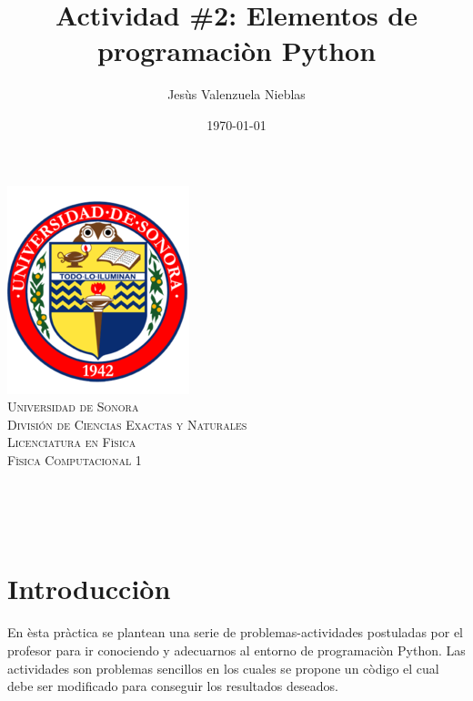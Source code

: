 \documentclass[12pt]{article}
\title{Actividad \#2: Elementos de programaciòn Python }
\author{\Large Jesùs Valenzuela Nieblas\\}
\date{\today}
\makeatletter
\let\thetitle\@title
\let\theauthor\@author
\let\thedate\@date
\makeatother
\begin{document}

\begin{titlepage}
	\centering
    \vspace*{.5cm}
     \includegraphics[scale = 0.7]{logo}\\	%
    \textsc{\Large Universidad de Sonora}\\[1.0 cm]	%
	\textsc{\Large División de Ciencias Exactas y Naturales}\\[.50 cm]
  	\textsc{\Large Licenciatura en Fìsica}\\[.5 cm]
  \textsc{\large Fìsica Computacional 1}\\[1.5 cm]				%
	
	{ \huge \bfseries \thetitle}\\

    \vspace*{3 cm}
	\begin{minipage}{\textwidth}
    \centering
    \theauthor
	\end{minipage}\\[3 cm]
	{\large \thedate}\\[2 cm]
 
	\vfill
	
\end{titlepage}

\section{Introducciòn}
En èsta pràctica se plantean una serie de problemas-actividades postuladas por el profesor para ir conociendo y adecuarnos al entorno de programaciòn Python. Las actividades son problemas sencillos en los cuales se propone un còdigo el cual debe ser modificado para conseguir los resultados deseados.
\end{document}
